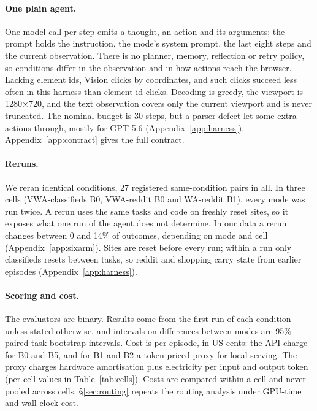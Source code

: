 \paragraph{One plain agent.} One model call per step emits a thought, an action and its arguments; the prompt holds the instruction, the mode's system prompt, the last eight steps and the current observation. There is no planner, memory, reflection or retry policy, so conditions differ in the observation and in how actions reach the browser. Lacking element ids, Vision clicks by coordinates, and such clicks succeed less often in this harness than element-id clicks. Decoding is greedy, the viewport is 1280$\times$720, and the text observation covers only the current viewport and is never truncated. The nominal budget is 30 steps, but a parser defect let some extra actions through, mostly for GPT-5.6 (Appendix~\ref{app:harness}). Appendix~\ref{app:contract} gives the full contract.

\paragraph{Reruns.} We reran identical conditions, 27 registered same-condition pairs in all. In three cells (VWA-classifieds B0, VWA-reddit B0 and WA-reddit B1), every mode was run twice. A rerun uses the same tasks and code on freshly reset sites, so it exposes what one run of the agent does not determine. In our data a rerun changes between 0 and 14\% of outcomes, depending on mode and cell (Appendix~\ref{app:sixarm}). Sites are reset before every run; within a run only classifieds resets between tasks, so reddit and shopping carry state from earlier episodes (Appendix~\ref{app:harness}).

\paragraph{Scoring and cost.} The evaluators are binary. Results come from the first run of each condition unless stated otherwise, and intervals on differences between modes are 95\% paired task-bootstrap intervals. Cost is per episode, in US cents: the API charge for B0 and B5, and for B1 and B2 a token-priced proxy for local serving. The proxy charges hardware amortisation plus electricity per input and output token (per-cell values in Table~\ref{tab:cells}). Costs are compared within a cell and never pooled across cells. \S\ref{sec:routing} repeats the routing analysis under GPU-time and wall-clock cost.
